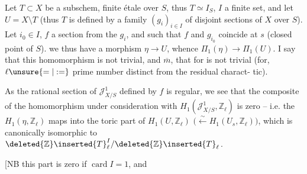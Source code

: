 Let $T\subset X$ be a subschem, finite étale over $S$, thus $T\simeq I_S$, $I$ a finite set, and let $U=X\setminus T$ (thus $T$ is defined by a family $(g_i)_{i\in I}$ of disjoint sections of $X$ over $S$).  Let  $i_0\in I$, $f$ a section  from the $g_i$, and such that  $f$ and $g_{i_0}$ coincide at $s$ (closed point of $S$).      we thus have a morphism $\eta\longrightarrow U$, whence $\Pi_1(\eta)\longrightarrow\Pi_1(U)$. I say that this homomorphism is not trivial,  and $\overline m$,  that for 
is not trivial (for,  $\ell\unsure{=|:=}$ prime number distinct from the residual charact-\newline
tic).

As the rational section of $\mathcal J^1_{X/S}$ defined by $f$ is regular, we see that the composite of the homomorphism under consideration with $H_1(\mathcal J^1_{X/S},\mathbb Z_\ell)$ is zero -- i.e. the $H_1(\eta,\mathbb Z_\ell)$ maps into the toric part of $H_1(U,\mathbb Z_\ell)$ $\bigl(\xleftarrow{\sim}H_1(U_s,\mathbb Z_\ell)\bigr)$, which is canonically isomorphic to $\deleted{\mathbb Z}\inserted{T}_\ell^I/\deleted{\mathbb Z}\inserted{T}_\ell$.

[NB this part is zero if $\operatorname{card}I=1$, and
